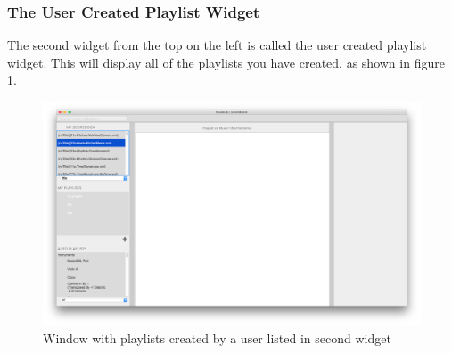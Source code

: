 \subsubsection{The User Created Playlist Widget}
The second widget from the top on the left is called the user created playlist widget. This will display all of the playlists you have created, as shown in figure \ref{fig:createdplaylists}. 
\begin{figure}[H]
\centering
\includegraphics[width=500pt]{main_screenshot}
\caption{Window with playlists created by a user listed in second widget}
\label{fig:createdplaylists}	
\end{figure}

